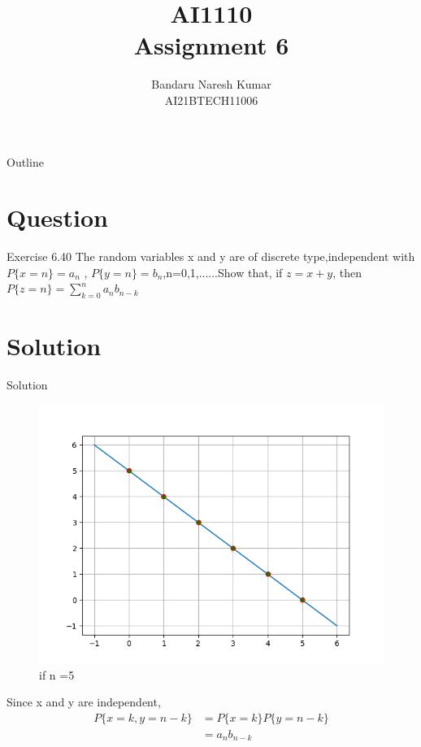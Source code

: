 \documentclass{beamer}
\title{AI1110 \\ Assignment 6}
\author{Bandaru Naresh Kumar \\ AI21BTECH11006}
\date{}
\begin{document}
	\begin{frame}
		\titlepage
	\end{frame}
	
	\begin{frame}{Outline}
    		\tableofcontents
	\end{frame}
	
	\section{Question}
	\begin{frame}{Exercise 6.40}
	The random variables x and y are of discrete type,independent with $P\{x=n\} = a_n$ , $P\{y=n\} = b_n$,n=0,1,......Show that, if $z = x+y$, then \\
	$P\{z=n\} = \sum\limits^{n}_{k=0}a_n b_{n-k}$
	\end{frame}
	
	\section{Solution}
	\begin{frame}{Solution}
	   \begin{figure}
	       \centering
           \includegraphics[scale=0.25]{figures/Figure_1.png} 
	       \caption{if n =5}
	       \label{if n=5}
	   \end{figure}
	   Since x and y are independent,
	   \begin{align}
	       P\{x=k,y=n-k\} &= P\{x=k\}P\{y=n-k\}\\
	                      &= a_n b_{n-k}
	   \end{align}
	 \end{frame}
	
\end{document}
